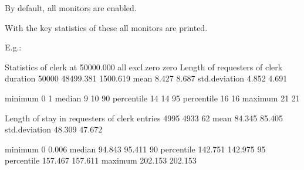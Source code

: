 \documentclass[letterpaper,10pt,english]{sphinxmanual}
\begin{document}
By default, all monitors are enabled.

With  the key statistics of these all monitors are printed.

E.g.:

\begin{sphinxVerbatim}[commandchars=\\\{\}]
Statistics of clerk at     50000.000
                                                                     all    excl.zero         zero
\PYGZhy{}\PYGZhy{}\PYGZhy{}\PYGZhy{}\PYGZhy{}\PYGZhy{}\PYGZhy{}\PYGZhy{}\PYGZhy{}\PYGZhy{}\PYGZhy{}\PYGZhy{}\PYGZhy{}\PYGZhy{}\PYGZhy{}\PYGZhy{}\PYGZhy{}\PYGZhy{}\PYGZhy{}\PYGZhy{}\PYGZhy{}\PYGZhy{}\PYGZhy{}\PYGZhy{}\PYGZhy{}\PYGZhy{}\PYGZhy{}\PYGZhy{}\PYGZhy{}\PYGZhy{}\PYGZhy{}\PYGZhy{}\PYGZhy{}\PYGZhy{}\PYGZhy{}\PYGZhy{}\PYGZhy{}\PYGZhy{}\PYGZhy{}\PYGZhy{}\PYGZhy{}\PYGZhy{}\PYGZhy{}\PYGZhy{} \PYGZhy{}\PYGZhy{}\PYGZhy{}\PYGZhy{}\PYGZhy{}\PYGZhy{}\PYGZhy{}\PYGZhy{}\PYGZhy{}\PYGZhy{}\PYGZhy{}\PYGZhy{}\PYGZhy{}\PYGZhy{} \PYGZhy{}\PYGZhy{}\PYGZhy{}\PYGZhy{}\PYGZhy{}\PYGZhy{}\PYGZhy{}\PYGZhy{}\PYGZhy{}\PYGZhy{}\PYGZhy{}\PYGZhy{} \PYGZhy{}\PYGZhy{}\PYGZhy{}\PYGZhy{}\PYGZhy{}\PYGZhy{}\PYGZhy{}\PYGZhy{}\PYGZhy{}\PYGZhy{}\PYGZhy{}\PYGZhy{} \PYGZhy{}\PYGZhy{}\PYGZhy{}\PYGZhy{}\PYGZhy{}\PYGZhy{}\PYGZhy{}\PYGZhy{}\PYGZhy{}\PYGZhy{}\PYGZhy{}\PYGZhy{}
Length of requesters of clerk                duration          50000        48499.381     1500.619
                                             mean                  8.427        8.687
                                             std.deviation         4.852        4.691

                                             minimum               0            1
                                             median                9           10
                                             90\PYGZpc{} percentile       14           14
                                             95\PYGZpc{} percentile       16           16
                                             maximum              21           21

Length of stay in requesters of clerk        entries            4995         4933           62
                                             mean                 84.345       85.405
                                             std.deviation        48.309       47.672

                                             minimum               0            0.006
                                             median               94.843       95.411
                                             90\PYGZpc{} percentile      142.751      142.975
                                             95\PYGZpc{} percentile      157.467      157.611
                                             maximum             202.153      202.153


\end{sphinxVerbatim}
\end{document}
